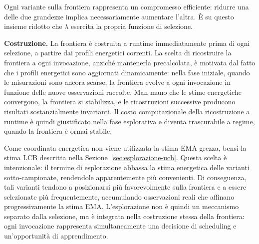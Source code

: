 Ogni variante sulla frontiera rappresenta un compromesso efficiente:
ridurre una delle due grandezze implica necessariamente aumentare
l'altra. È su questo insieme ridotto che $\lambda$ esercita la
propria funzione di selezione.

\medskip
\noindent\textbf{Costruzione.}
La frontiera è costruita a runtime immediatamente prima di ogni
selezione, a partire dai profili energetici correnti. La scelta di
ricostruire la frontiera a ogni invocazione, anziché mantenerla
precalcolata, è motivata dal fatto che i profili energetici sono
aggiornati dinamicamente: nella fase iniziale, quando le misurazioni
sono ancora scarse, la frontiera evolve a ogni invocazione in funzione
delle nuove osservazioni raccolte. Man mano che le stime energetiche
convergono, la frontiera si stabilizza, e le ricostruzioni successive producono risultati sostanzialmente invarianti. Il costo computazionale della ricostruzione a runtime è quindi
giustificato nella fase esplorativa e diventa trascurabile a regime,
quando la frontiera è ormai stabile.

Come coordinata energetica non viene utilizzata la stima EMA grezza,
bensì la stima LCB descritta nella Sezione~\ref{sec:esplorazione-ucb}.
Questa scelta è intenzionale: il termine di esplorazione abbassa
la stima energetica delle varianti sotto-campionate, rendendole
apparentemente più convenienti.
Di conseguenza, tali varianti tendono a posizionarsi più
favorevolmente sulla frontiera e a essere selezionate più
frequentemente, accumulando osservazioni reali che affinano
progressivamente la stima EMA.
L'esplorazione non è quindi un meccanismo separato dalla selezione,
ma è integrata nella costruzione stessa della frontiera: ogni
invocazione rappresenta simultaneamente una decisione di scheduling
e un'opportunità di apprendimento.




